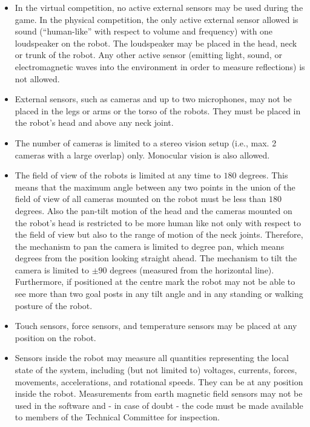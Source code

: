 \begin{itemize}
\item In the virtual competition, no active external sensors may be used during the game. In the physical competition, the only active external sensor allowed is sound
(``human-like'' with respect to volume and frequency) with one loudspeaker on the robot. The loudspeaker may be placed in the head, neck or trunk of the robot. Any
other active sensor (emitting light, sound, or electromagnetic waves into the environment in order to measure reflections) is not allowed.
\item External sensors, such as cameras and up to two microphones, may not be placed in the legs or arms or the
torso of the robots. They must be placed in the robot's
head and above any neck joint. 
\item The number of cameras is limited to a stereo vision setup (i.e., max. 2 cameras with a large overlap) only. Monocular vision is also allowed.
\item The field of view of the robots is limited at any time to $180$ degrees. This means that the maximum angle between any two points in the union of the field of view of all cameras mounted on the robot must be less than $180$ degrees. Also the pan-tilt motion of the head and the cameras mounted on the robot's head is restricted to be more human like not only with respect to the field of view but also to the range of motion of the neck joints. Therefore, the mechanism to pan the camera is limited to  degree pan, which means  degrees from the position looking straight ahead. The mechanism to tilt the camera is limited to $\pm90$ degrees (measured from the horizontal line). Furthermore, if positioned at the centre mark the robot may not be able to see more than two goal posts in any tilt angle and in any standing or walking posture of the robot. 
\item Touch sensors, force sensors, and temperature sensors may be placed at any position on the robot.
\item Sensors inside the robot may measure all quantities representing the local state of the system, including (but not limited to) voltages, currents, forces, movements, accelerations, and rotational speeds. They can be at any position inside the robot. Measurements from earth magnetic field sensors may not be used in the software and - in case of doubt - the code must be made available to members of the Technical Committee for inspection.
\end{itemize}

